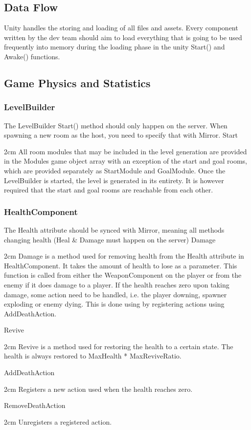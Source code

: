 \documentclass[11pt]{article}
\newenvironment{indentall}{\begin{adjustwidth}{2cm}{}}{\end{adjustwidth}}
\begin{document}
\subsection{Data Flow}
Unity handles the storing and loading of all files and assets. Every component written by the dev team should aim to load everything that is going to be used frequently into memory during the loading phase in the unity Start() and Awake() functions.

\subsection{Game Physics and Statistics}
\subsubsection{LevelBuilder}
The LevelBuilder Start() method should only happen on the server. When spawning a new room as the host, you need to specify that with Mirror.
\newline 
\newline Start
\begin{indentall}
All room modules that may be included in the level generation are provided in the Modules game object array with an exception of the start and goal rooms, which are provided separately as StartModule and GoalModule. Once the LevelBuilder is started, the level is generated in its entirety. It is however required that the start and goal rooms are reachable from each other.
\end{indentall}

\subsubsection{HealthComponent}
The Health attribute should be synced with Mirror, meaning all methods changing health (Heal \& Damage must happen on the server)
\newline 
\newline Damage
\begin{indentall}
Damage is a method used for removing health from the Health attribute in HealthComponent. It takes the amount of health to lose as a parameter. This function is called from either the WeaponComponent on the player or from the enemy if it does damage to a player. If the health reaches zero upon taking damage, some action need to be handled, i.e. the player downing, spawner exploding or enemy dying. This is done using by registering actions using AddDeathAction.
\end{indentall}
Revive
\begin{indentall}
Revive is a method used for restoring the health to a certain state. The health is always restored to MaxHealth * MaxReviveRatio.
\end{indentall}
AddDeathAction
\begin{indentall}
Registers a new action used when the health reaches zero.
\end{indentall}
RemoveDeathAction
\begin{indentall}
Unregisters a registered action.
\end{indentall}
\end{document}
